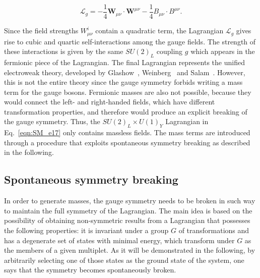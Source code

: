 \begin{equation}\label{eqn:SM_e20}
\mathcal{L}_g = -\frac{1}{4}\textbf{W}_{\mu\nu} \cdot \textbf{W}^{\mu\nu} - \frac{1}{4}B_{\mu\nu} \cdot B^{\mu\nu}.
\end{equation}

Since the field strengths $W^i_{\mu\nu}$ contain a quadratic term, the Lagrangian $\mathcal{L}_g$ gives rise to cubic and quartic self-interactions among the gauge fields.
The strength of these interactions is given by the same $SU(2)_L$ coupling $g$ which appears in the fermionic piece of the Lagrangian.
The final Lagrangian represents the unified electroweak theory, developed by Glashow~\cite{GLASHOW1961579}, Weinberg~\cite{PhysRevLett.19.1264} and Salam~\cite{RevModPhys.52.525}.
However, this is not the entire theory since the gauge symmetry forbids writing a mass term for the gauge bosons.
Fermionic masses are also not possible, because they would connect the left- and right-handed fields, which have different transformation properties, and therefore would produce an explicit breaking of the gauge symmetry.
Thus, the $SU(2)_L\times U(1)_Y$ Lagrangian in Eq.~\ref{eqn:SM_e17} only contains massless fields.
The mass terms are introduced through a procedure that exploits spontaneous symmetry breaking as described in the following.

\subsection{Spontaneous symmetry breaking}\label{subsec:EWSB}

In order to generate masses, the gauge symmetry needs to be broken in such way to maintain the full symmetry of the Lagrangian.
The main idea is based on the possibility of obtaining non-symmetric results from a Lagrangian that possesses the following properties:
it is invariant under a group $G$ of transformations and has a degenerate set of states with minimal energy, which transform under $G$ as the members of a given multiplet.
As it will be demonstrated in the following, by arbitrarily selecting one of those states as the ground state of the system, one says that the symmetry becomes spontaneously broken.

